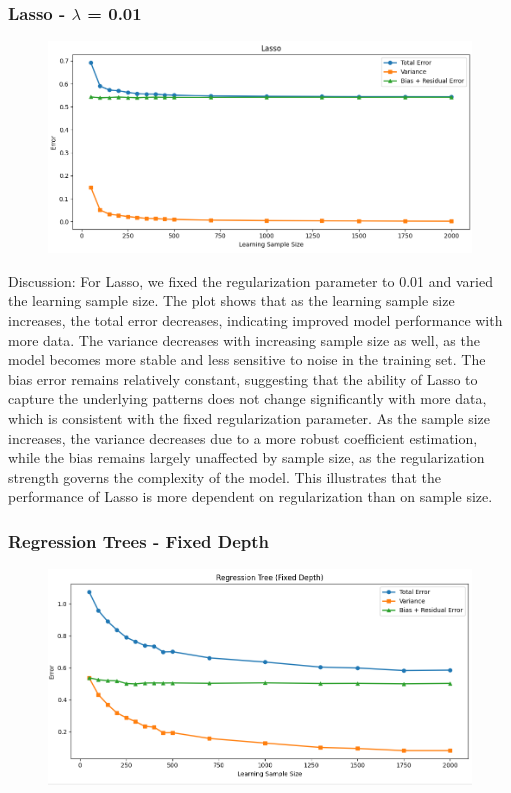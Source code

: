 \documentclass[a4paper,10pt]{article}
\begin{document}
\subsubsection{Lasso - $\lambda$ = 0.01 }

\begin{figure}[H]
    \centering
    \includegraphics[width=0.8\linewidth]{2.4_lasso.png}
\end{figure}

Discussion:  
For Lasso, we fixed the regularization parameter to 0.01 and varied the learning sample size. The plot shows that as the learning sample size increases, the total error decreases, indicating improved model performance with more data. The variance decreases with increasing sample size as well, as the model becomes more stable and less sensitive to noise in the training set. The bias error remains relatively constant, suggesting that the ability of Lasso to capture the underlying patterns does not change significantly with more data, which is consistent with the fixed regularization parameter. As the sample size increases, the variance decreases due to a more robust coefficient estimation, while the bias remains largely unaffected by sample size, as the regularization strength governs the complexity of the model. This illustrates that the performance of Lasso is more dependent on regularization than on sample size.

\subsubsection{Regression Trees - Fixed Depth}

\begin{figure}[H]
    \centering
    \includegraphics[width=0.8\linewidth]{2.4_rt_fixed.png}
\end{figure}
\end{document}
